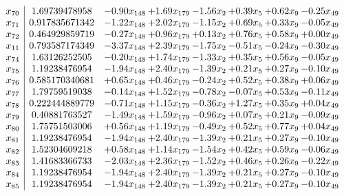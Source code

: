 \documentclass[8pt]{article}
\begin{document}
\[\begin{array}{c| c c@{\hskip 2pt} c@{\hskip 2pt} c@{\hskip 2pt} c@{\hskip 2pt} c@{\hskip 2pt} c@{\hskip 2pt} }
 x_{70}   &  1.69739478958 & -0.90 x_{148} & +  1.69 x_{179} & -1.56 x_{2} & +  0.39 x_{5} & +  0.62 x_{9} & -0.25 x_{49}\\
 x_{71}   &  0.917835671342 & -1.22 x_{148} & +  2.02 x_{179} & -1.15 x_{2} & +  0.69 x_{5} & +  0.33 x_{9} & -0.05 x_{49}\\
 x_{72}   &  0.464929859719 & -0.27 x_{148} & +  0.96 x_{179} & +  0.13 x_{2} & +  0.76 x_{5} & +  0.58 x_{9} & +  0.00 x_{49}\\
 x_{11}   &  0.793587174349 & -3.37 x_{148} & +  2.39 x_{179} & -1.75 x_{2} & -0.51 x_{5} & -0.24 x_{9} & -0.30 x_{49}\\
 x_{74}   &  1.63126252505 & -0.20 x_{148} & +  1.74 x_{179} & -1.33 x_{2} & +  0.35 x_{5} & +  0.56 x_{9} & -0.05 x_{49}\\
 x_{75}   &  1.19238476954 & -1.94 x_{148} & +  2.40 x_{179} & -1.39 x_{2} & +  0.21 x_{5} & +  0.27 x_{9} & -0.10 x_{49}\\
 x_{76}   &  0.585170340681 & +  0.65 x_{148} & +  0.46 x_{179} & -0.24 x_{2} & +  0.52 x_{5} & +  0.38 x_{9} & +  0.06 x_{49}\\
 x_{77}   &  1.79759519038 & -0.14 x_{148} & +  1.52 x_{179} & -0.78 x_{2} & -0.07 x_{5} & +  0.53 x_{9} & -0.11 x_{49}\\
 x_{78}   &  0.222444889779 & -0.71 x_{148} & +  1.15 x_{179} & -0.36 x_{2} & +  1.27 x_{5} & +  0.35 x_{9} & +  0.04 x_{49}\\
 x_{79}   &  0.40881763527 & -1.49 x_{148} & +  1.59 x_{179} & -0.96 x_{2} & +  0.07 x_{5} & +  0.21 x_{9} & -0.09 x_{49}\\
 x_{80}   &  1.75751503006 & +  0.56 x_{148} & +  1.19 x_{179} & -0.49 x_{2} & +  0.52 x_{5} & +  0.77 x_{9} & +  0.04 x_{49}\\
 x_{81}   &  1.19238476954 & -1.94 x_{148} & +  2.40 x_{179} & -1.39 x_{2} & +  0.21 x_{5} & +  0.27 x_{9} & -0.10 x_{49}\\
 x_{82}   &  1.52304609218 & +  0.58 x_{148} & +  1.14 x_{179} & -1.54 x_{2} & +  0.42 x_{5} & +  0.59 x_{9} & -0.06 x_{49}\\
 x_{83}   &  1.41683366733 & -2.03 x_{148} & +  2.36 x_{179} & -1.52 x_{2} & +  0.46 x_{5} & +  0.26 x_{9} & -0.22 x_{49}\\
 x_{84}   &  1.19238476954 & -1.94 x_{148} & +  2.40 x_{179} & -1.39 x_{2} & +  0.21 x_{5} & +  0.27 x_{9} & -0.10 x_{49}\\
 x_{85}   &  1.19238476954 & -1.94 x_{148} & +  2.40 x_{179} & -1.39 x_{2} & +  0.21 x_{5} & +  0.27 x_{9} & -0.10 x_{49}\\

\end{array}\]
\end{document}
